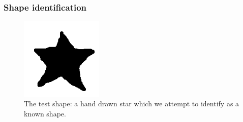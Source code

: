 \documentclass[a4paper, 12pt]{article}
\begin{document}
\subsubsection{Shape identification\label{sec:shapematch}}

\begin{figure}[!h]
  \centering
  \includegraphics[width=0.35\textwidth]{img/shapematch/test_star.png}
  \caption{The test shape: a hand drawn star which we attempt to identify as a known shape.}
  \label{fig:hand_star}
\end{figure}
\end{document}
